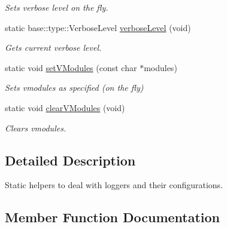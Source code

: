 \begin{DoxyCompactItemize}
\begin{DoxyCompactList}\small\item\em Sets verbose level on the fly. \end{DoxyCompactList}\item 
static base\+::type\+::\+Verbose\+Level \hyperlink{classel_1_1Loggers_ad4840bb4b6b80746a2212cf3cc058142}{verbose\+Level} (void)\hypertarget{classel_1_1Loggers_ad4840bb4b6b80746a2212cf3cc058142}{}\label{classel_1_1Loggers_ad4840bb4b6b80746a2212cf3cc058142}

\begin{DoxyCompactList}\small\item\em Gets current verbose level. \end{DoxyCompactList}\item 
static void \hyperlink{classel_1_1Loggers_acbc5e2cef230331c57f364852a671507}{set\+V\+Modules} (const char $\ast$modules)\hypertarget{classel_1_1Loggers_acbc5e2cef230331c57f364852a671507}{}\label{classel_1_1Loggers_acbc5e2cef230331c57f364852a671507}

\begin{DoxyCompactList}\small\item\em Sets vmodules as specified (on the fly) \end{DoxyCompactList}\item 
static void \hyperlink{classel_1_1Loggers_afcf50abc11530eb7f28fcab7eab27e4f}{clear\+V\+Modules} (void)\hypertarget{classel_1_1Loggers_afcf50abc11530eb7f28fcab7eab27e4f}{}\label{classel_1_1Loggers_afcf50abc11530eb7f28fcab7eab27e4f}

\begin{DoxyCompactList}\small\item\em Clears vmodules. \end{DoxyCompactList}\end{DoxyCompactItemize}


\subsection{Detailed Description}
Static helpers to deal with loggers and their configurations. 

\subsection{Member Function Documentation}
